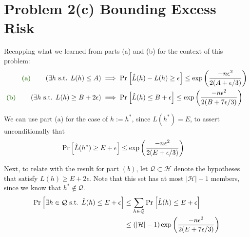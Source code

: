 \documentclass[11pt]{article}
\newcommand{\1}{\mathbb{I}} %
\begin{document}
\clearpage
\section*{Problem 2(c) Bounding Excess Risk}

Recapping what we learned from parts (a) and (b) for the context of this problem:
\begin{align}
	\mtgreen{(a)}\qquad 
	\lr{ \exists h \text{ s.t. } L(h) \leq A } 
	&\implies \Prob{ \hat L (h) - L(h) \geq \epsilon }
	\leq \exp\lr{   \frac{ -n\epsilon^2  }{ 2(A + \epsilon/ 3) }  } \\
	\mtgreen{(b)} \qquad 
	\lr{ \exists h \text{ s.t. } L(h) \geq B + 2\epsilon } 
	&\implies 
	\Prob{\hat L(h) \leq B + \epsilon } \leq \exp\lr{   \frac{ -n\epsilon^2  }{ 2(B +7 \epsilon/ 3) }  } 
\end{align}

We can use part (a) for the case of $h := h^*$, since $L(h^*) = E$, to assert unconditionally that
\begin{align}
	\text{Pr}_{}\left[ \hat L(h^*) \geq E + \epsilon \right]
	&\leq \exp\left(    \frac{ -n\epsilon^2  }{ 2(E + \epsilon/ 3) }   \right) 
\end{align}

\begin{comment}
Henceforth, let 
\begin{align}
	P_a &= \Prob{ \hat L(h^*) \geq E + \epsilon } \\
	P_b &= \Prob{ \hat L(h) \leq E + \epsilon \mid L(h) \geq E + 2\epsilon}
\end{align}
	
We can then relate the excess risk probability with $P_a$ and $P_b$ as follows. First note that $\{ L(\hat h) - L(h^*) \geq 2\epsilon \} \subseteq A \cup B$, since if $L(\hat h) \geq E + 2\epsilon$, then either $\hat L(h^*) \geq E + \epsilon$ (part (a))  OR  $\hat L(\hat h) \leq E + \epsilon$ (part (b)). 
\end{comment}

Next, to relate with the result for part $(b)$, let $\mathcal Q \subset \mathcal H$ denote the hypotheses that satisfy $L(h) \geq E + 2\epsilon$. Note that this set has at most $|\mathcal H| - 1$ members, since we know that $h^* \notin \mathcal Q$. 
\begin{align}
	\text{Pr}_{}\left[ \exists h \in \mathcal Q \text{ s.t. } \hat L(h)   \leq E + \epsilon  \right]
		&\leq \sum_{h \in \mathcal Q} \text{Pr}_{}\left[ \hat L(h)   \leq E + \epsilon  \right] \\
		&\leq \left(  | \mathcal H| - 1  \right)\exp\left(    \frac{ -n\epsilon^2  }{ 2(E +7 \epsilon/ 3) }   \right) 
\end{align}
\end{document}
